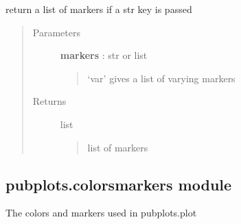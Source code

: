 \documentclass[letterpaper,10pt,english]{sphinxmanual}
\begin{document}

\begin{fulllineitems}
\label{pubplots:pubplots.plot.set_markers}
return a list of markers if a str key is passed
\begin{quote}\begin{description}
\item[{Parameters}] \leavevmode
\textbf{markers} : str or list
\begin{quote}

`var' gives a list of varying markers
\end{quote}

\item[{Returns}] \leavevmode
list
\begin{quote}

list of markers
\end{quote}

\end{description}\end{quote}

\end{fulllineitems}



\subsection{pubplots.colorsmarkers module}
\label{pubplots:module-pubplots.colorsmarkers}\label{pubplots:pubplots-colorsmarkers-module}
The colors and markers used in pubplots.plot
\end{document}
